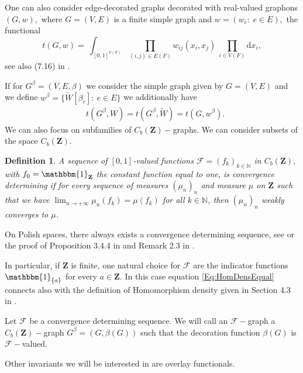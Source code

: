\documentclass[11pt]{article}
\newtheorem{definition}[theorem]{Definition}
\def\N{\mathbb{N}}
\newcommand{\cF}{{\mathcal F}}  %
\newcommand{\Space}{\mathbf{Z}}
\newcommand{\CbFunct}{C_b(\Space)}
\newcommand{\F}{\mathcal{F}}
\newcommand{\un}{\mathbbm{1}}
\newcommand{\drv}{\mathrm{d}}
\begin{document}
One can also consider edge-decorated graphs decorated with real-valued graphons $(G,w),$ where $G=(V,E)$ is a finite simple graph and $w=(w_e:\ e\in E),$ the functional $$t(G,w)= \ \int_{[0,1]^{V(F)}}  \prod_{(i,j)\in E(F)} w_{ij}(x_i,x_j )		\	\prod_{i\in V(F)} \drv x_i,$$
see also (7.16) in \cite{LovaszGraphLimits}.

If for  $G^{\beta}=(V,E,\beta)$ we consider the simple graph given by $G=(V,E)$ and we define $w^{\beta}=\{\widetilde{W}[\beta_{e}]: \ e\in E\}$ we additionally have 
\begin{equation}
\begin{aligned}\label{Eq:HomDensEqual}
     &t(G^{\beta},W)= t(G^{\beta},\widetilde{W})=t(G,w^{\beta}).
     \end{aligned}
   \end{equation}
We can also focus on subfamilies of $\CbFunct-$graphs. We can consider subsets of the space $\CbFunct.$ 

\begin{definition}
    A sequence of $[0,1]$-valued functions $\F = (f_k )_{k\in\N}$ in $\CbFunct$, with $f_0=\un_{\mathbf{Z}}$ the constant function equal to one, is \emph{convergence determining}  if for every sequence of measures $(\mu_n)_{n}$  and  measure $\mu$ on $\Space$ such  that we have $\lim_{n\to +\infty} \mu_n(f_k)  = \mu(f_k)$ for all $k\in\N$, then $(\mu_n )_{n}$ weakly converges to $\mu$.

\end{definition}
On Polish spaces, there always exists a convergence determining sequence, see \cite[Corollary 2.2.6]{Bogachev} or the proof of Proposition 3.4.4 in \cite{Ethier} and Remark 2.3 in \cite{abraham2023probabilitygraphons}. 


In particular, if $\Space$ is finite, one natural choice for $\cF$ are the indicator functions $\mathbbm{1}_{\{a\}}$ for every $a\in \Space.$ In this case equation \eqref{Eq:HomDensEqual} connects also with the definition of Homomorphism density given in Section 4.3 in \cite{HypergraphonsZhao}. 

Let $\cF$ be a convergence determining sequence. We will call an $\cF-$graph a $\CbFunct-$graph $G^{\beta}=(G,\beta(G))$ such that the decoration function $\beta(G)$ is $\cF-$valued. 

Other invariants we will be interested in are overlay functionals.
\end{document}
